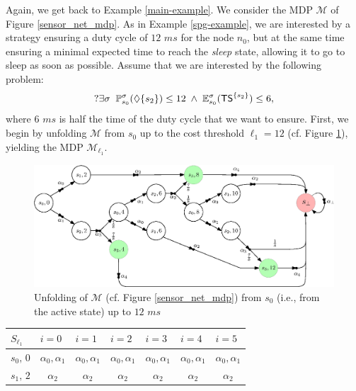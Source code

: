 \begin{example}
  Again, we get back to Example \ref{main-example}.
  We consider the MDP $\mathcal{M}$ of Figure \ref{sensor_net_mdp}. As in Example \ref{spg-example}, we are interested by a strategy ensuring a duty cycle of $12$ $ms$ for the node $n_0$, but at the same time ensuring a minimal expected time to reach the \textit{sleep} state, allowing it to go to sleep as soon as possible.
  Assume that we are interested by the following \SSPWE{} problem:
  \[
    ?\exists \sigma \; \;  \mathbb{P}^\sigma_{s_0}(\Diamond \{s_2\}) \leq 12 \; \wedge \; \mathbb{E}^\sigma_{s_0}(\text{\sffamily TS}^{\{s_2\}}) \leq 6,
  \]
  where $6$ $ms$ is half the time of the duty cycle that we want to ensure. First, we begin by unfolding $\mathcal{M}$ from $s_0$ up to the cost threshold $\ell_1 = 12$ (cf. Figure \ref{unfolding-sspwe}), yielding the MDP $\mathcal{M}_{\ell_1}$.
  \begin{figure}[h]
    \centering
    \includegraphics[width=0.9\linewidth]{resources/main-example-unfolding}
    \captionsetup{justification=centering}
    \caption{Unfolding of $\mathcal{M}$ (cf. Figure \ref{sensor_net_mdp}) from $s_0$ (i.e., from the active state) up to $12$ $ms$}
    \label{unfolding-sspwe}
  \end{figure}
  \begin{table}[h]
  \centering
\begin{tabular}{l|cccccc}
$S_{\ell_1}$          & \multicolumn{1}{l}{$i=0$} & \multicolumn{1}{l}{$i=1$}                                  & \multicolumn{1}{l}{$i=2$}  & \multicolumn{1}{l}{$i=3$}  & \multicolumn{1}{l}{$i=4$} & \multicolumn{1}{l}{$i=5$} \\ \hline
$s_0, \, 0$  & $\alpha_0, \alpha_1$      & $\alpha_0, \alpha_1$                                       & $\alpha_0, \alpha_1$       & $\alpha_0, \alpha_1$       & $\alpha_0, \alpha_1$      & $\alpha_0, \alpha_1$      \\
$s_1, \, 2$  & $\alpha_2$                & $\alpha_2$                                                 & $\alpha_2$                 & $\alpha_2$                 & $\alpha_2$                & $\alpha_2$                \\

\end{tabular}
\end{table}
\end{example}
